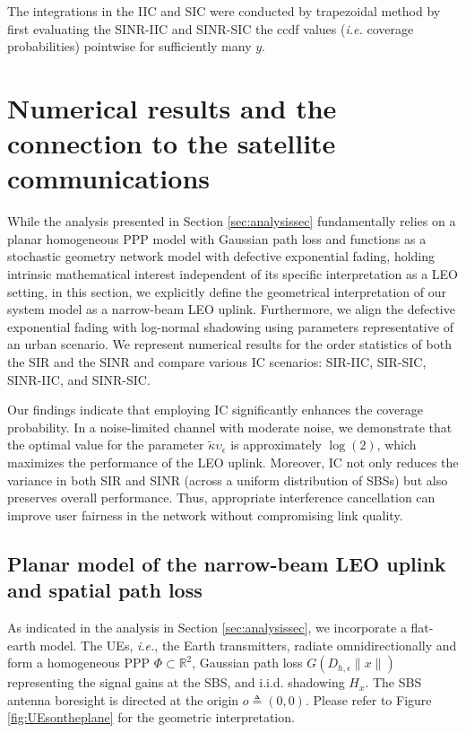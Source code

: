 \documentclass[lettersize,journal]{IEEEtran}
\newcommand{\R}{\mathbb{R}}
\begin{document}
The integrations in the IIC and SIC were conducted by trapezoidal method by first evaluating the SINR-IIC and SINR-SIC the ccdf values (\textit{i.e.} coverage probabilities) pointwise for sufficiently many $y$.






\section{Numerical results and the connection to the satellite communications}

\label{sec:numericalresultsandconnectiontoLEO}
While the analysis presented in Section \ref{sec:analysissec} fundamentally relies on a planar homogeneous PPP model with Gaussian path loss and functions as a stochastic geometry network model with defective exponential fading, holding intrinsic mathematical interest independent of its specific interpretation as a LEO setting, in this section, we explicitly define the geometrical interpretation of our system model as a narrow-beam LEO uplink. Furthermore, we align the defective exponential fading with log-normal shadowing using parameters representative of an urban scenario. We represent numerical results for the order statistics of both the SIR and the SINR and compare various IC scenarios: SIR-IIC, SIR-SIC, SINR-IIC, and SINR-SIC.

Our findings indicate that employing IC significantly enhances the coverage probability. In a noise-limited channel with moderate noise, we demonstrate that the optimal value for the parameter $\tilde{\kappa} \upsilon_{\epsilon}$ is approximately $\log(2)$, which maximizes the performance of the LEO uplink. Moreover, IC not only reduces the variance in both SIR and SINR (across a uniform distribution of SBSs) but also preserves overall performance. Thus, appropriate interference cancellation can improve user fairness in the network without compromising link quality.



\subsection{Planar model of the narrow-beam LEO uplink and spatial path loss}

As indicated in the analysis in Section \ref{sec:analysissec}, we incorporate a flat-earth model. The UEs, \textit{i.e.}, the Earth transmitters, radiate omnidirectionally and form a homogeneous PPP $\Phi \subset \R^2$, Gaussian path loss $G(D_{h,\epsilon}\|x\|)$ representing the signal gains at the SBS, and i.i.d. shadowing $H_x$. The SBS antenna boresight is directed at the origin $\textit{o} \triangleq (0,0)$. Please refer to Figure \ref{fig:UEsontheplane} for the geometric interpretation.
\end{document}
